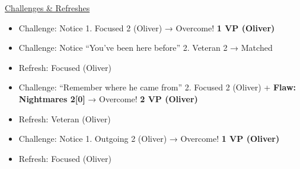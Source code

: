 \underline{  {\LARGE Challenges \& Refreshes }  }



\begin{itemize}
\item Challenge: Notice 1.  Focused 2 (Oliver) → Overcome! \textbf{1 VP (Oliver)}
\item Challenge: Notice ``You've been here before'' 2.  Veteran 2 → Matched
\item Refresh: Focused (Oliver)
\item Challenge: ``Remember where he came from'' 2.  Focused 2 (Oliver) + \textbf{ {\color[RGB]{255,0,0}Flaw: Nightmares 2{[}0{]}} } → Overcome! \textbf{2 VP (Oliver)}
\end{itemize}

\begin{itemize}
\item Refresh: Veteran (Oliver)
\end{itemize}

\begin{itemize}
\item Challenge: Notice 1.  Outgoing 2 (Oliver) → Overcome! \textbf{1 VP (Oliver)}
\end{itemize}

\begin{itemize}
\item Refresh: Focused (Oliver)
\end{itemize}

